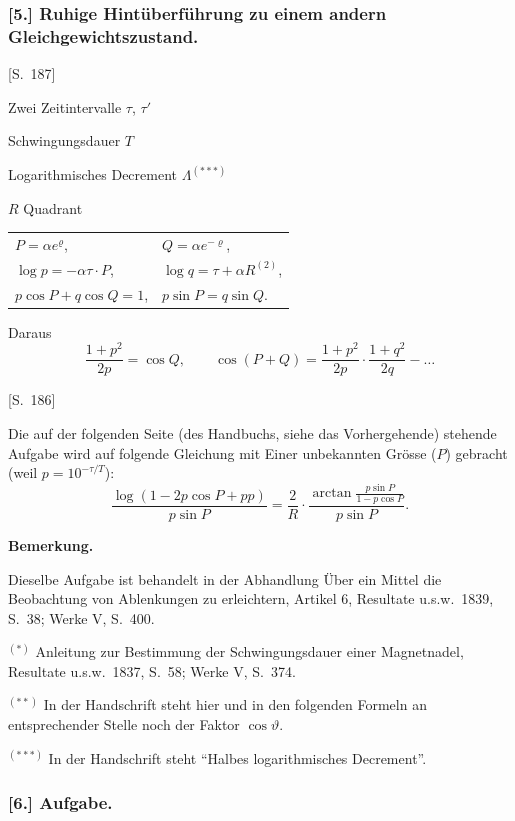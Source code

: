 \documentclass[12pt,a4paper]{article}
\begin{document}
\subsubsection*{[5.] Ruhige Hint\"uberf\"uhrung zu einem andern Gleichgewichtszustand.}

[S.~187]

Zwei Zeitintervalle $\tau$, $\tau'$

Schwingungsdauer $T$

Logarithmisches Decrement $\Lambda$$^{(***)}$

$R$ Quadrant

\begin{center}
\begin{tabular}{ll}
$P = \alpha e^{\varrho}$, & $Q = \alpha e^{-\varrho}$, \\
$\log p = -\alpha \tau \cdot P$, & $\log q = \tau + \alpha R^{(2)}$, \\
$p \cos P + q \cos Q = 1$, & $p \sin P = q \sin Q$.
\end{tabular}
\end{center}

Daraus
\[
\frac{1+p^2}{2p} = \cos Q, \qquad
\cos(P+Q) = \frac{1+p^2}{2p} \cdot \frac{1+q^2}{2q} - \ldots
\]

[S.~186]

Die auf der folgenden Seite (des Handbuchs, siehe das Vorhergehende) stehende Aufgabe wird auf folgende Gleichung mit Einer unbekannten Gr\"osse ($P$) gebracht (weil $p = 10^{-\tau/T}$):
\[
\frac{\log(1-2p\cos P + pp)}{p \sin P} = \frac{2}{R} \cdot
\frac{\arctan \frac{p \sin P}{1-p\cos P}}{p \sin P}.
\]

\medskip\noindent
\textbf{Bemerkung.}

Dieselbe Aufgabe ist behandelt in der Abhandlung \"Uber ein Mittel die Beobachtung von Ablenkungen zu erleichtern, Artikel 6, Resultate u.s.w.~1839, S.~38; Werke V, S.~400.

\medskip\noindent
$^{(*)}$ Anleitung zur Bestimmung der Schwingungsdauer einer Magnetnadel, Resultate u.s.w.~1837, S.~58; Werke V, S.~374.

$^{(**)}$ In der Handschrift steht hier und in den folgenden Formeln an entsprechender Stelle noch der Faktor $\cos \vartheta$.

$^{(***)}$ In der Handschrift steht ``Halbes logarithmisches Decrement''.


\subsubsection*{[6.] Aufgabe.}
\end{document}
